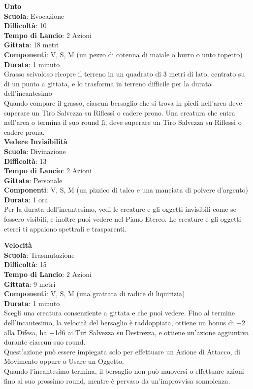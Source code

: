 \begin{multicols}{2}
\medskip\textbf{Unto}\\
\textbf{Scuola}: Evocazione\\
\textbf{Difficoltà}:  10\\
\textbf{Tempo di Lancio}: 2 Azioni\\
\textbf{Gittata}: 18 metri\\
\textbf{Componenti}: V, S, M (un pezzo di cotenna di maiale o burro o unto topetto)\\
\textbf{Durata}: 1 minuto\\
Grasso scivoloso ricopre il terreno in un quadrato di 3 metri di lato, centrato su di un punto a gittata, e lo trasforma in terreno difficile per la durata dell'incantesimo\\
Quando compare il grasso, ciascun bersaglio che si trova in piedi nell'area deve superare un Tiro Salvezza su Riflessi o cadere prono. Una creatura che entra nell'area o termina il suo round lì, deve superare un Tiro Salvezza su Riflessi o cadere prona.\\

\medskip\textbf{Vedere Invisibilità}\\
\textbf{Scuola}: Divinazione\\
\textbf{Difficoltà}:  13\\
\textbf{Tempo di Lancio}: 2 Azioni\\
\textbf{Gittata}: Personale\\
\textbf{Componenti}: V, S, M (un pizzico di talco e una manciata di polvere d'argento)\\
\textbf{Durata}: 1 ora\\
Per la durata dell'incantesimo, vedi le creature e gli oggetti invisibili come se fossero visibili, e inoltre puoi vedere nel Piano Etereo. Le creature e gli oggetti eterei ti appaiono spettrali e trasparenti.

\medskip\textbf{Velocità}\\
\textbf{Scuola}: Trasmutazione\\
\textbf{Difficoltà}:  15\\
\textbf{Tempo di Lancio}: 2 Azioni\\
\textbf{Gittata}: 9 metri\\
\textbf{Componenti}: V, S, M (una grattata di radice di liquirizia)\\
\textbf{Durata}: 1 minuto\\
Scegli una creatura consenziente a gittata e che puoi vedere. Fino al termine dell'incantesimo, la velocità del bersaglio è raddoppiata, ottiene un bonus di +2 alla Difesa, ha +1d6 ai Tiri Salvezza su Destrezza, e ottiene un'azione aggiuntiva durante ciascun suo round.\\
Quest'azione può essere impiegata solo per effettuare un Azione di Attacco, di Movimento oppure o Usare un Oggetto.\\
Quando l'incantesimo termina, il bersaglio non può muoversi o effettuare azioni fino al suo prossimo round, mentre è pervaso da un'improvvisa sonnolenza.


\end{multicols}
